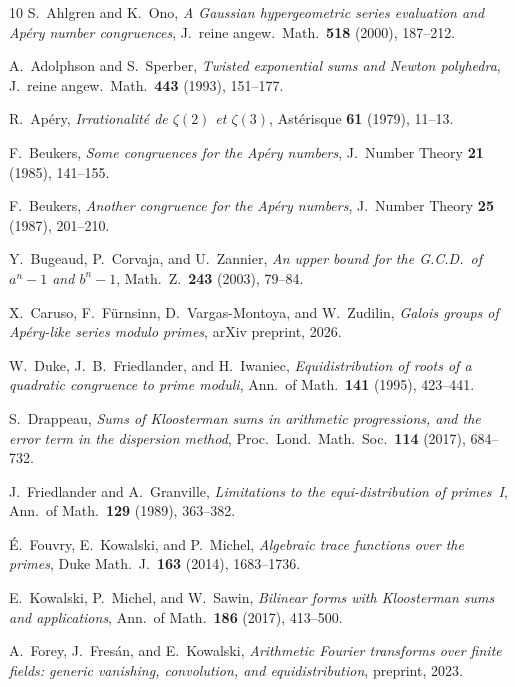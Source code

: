 \documentclass[11pt]{article}
\theoremstyle{definition}
\theoremstyle{remark}
\begin{document}
\begin{thebibliography}{10}
S.~Ahlgren and K.~Ono,
\emph{A Gaussian hypergeometric series evaluation and
Ap\'ery number congruences},
J.~reine angew.\ Math.\ \textbf{518} (2000), 187--212.

A.~Adolphson and S.~Sperber,
\emph{Twisted exponential sums and Newton polyhedra},
J.~reine angew.\ Math.\ \textbf{443} (1993), 151--177.

R.~Ap\'ery,
\emph{Irrationalit\'e de $\zeta(2)$ et $\zeta(3)$},
Ast\'erisque \textbf{61} (1979), 11--13.

F.~Beukers,
\emph{Some congruences for the Ap\'ery numbers},
J.~Number Theory \textbf{21} (1985), 141--155.

F.~Beukers,
\emph{Another congruence for the Ap\'ery numbers},
J.~Number Theory \textbf{25} (1987), 201--210.

Y.~Bugeaud, P.~Corvaja, and U.~Zannier,
\emph{An upper bound for the G.C.D.\ of $a^n - 1$ and $b^n - 1$},
Math.\ Z.\ \textbf{243} (2003), 79--84.

X.~Caruso, F.~F\"urnsinn, D.~Vargas-Montoya, and W.~Zudilin,
\emph{Galois groups of Ap\'ery-like series modulo primes},
arXiv preprint, 2026.

W.~Duke, J.~B.~Friedlander, and H.~Iwaniec,
\emph{Equidistribution of roots of a quadratic congruence
to prime moduli},
Ann.\ of Math.\ \textbf{141} (1995), 423--441.

S.~Drappeau,
\emph{Sums of Kloosterman sums in arithmetic progressions,
and the error term in the dispersion method},
Proc.\ Lond.\ Math.\ Soc.\ \textbf{114} (2017), 684--732.

J.~Friedlander and A.~Granville,
\emph{Limitations to the equi-distribution of primes~I},
Ann.\ of Math.\ \textbf{129} (1989), 363--382.

\'E.~Fouvry, E.~Kowalski, and P.~Michel,
\emph{Algebraic trace functions over the primes},
Duke Math.\ J.\ \textbf{163} (2014), 1683--1736.

E.~Kowalski, P.~Michel, and W.~Sawin,
\emph{Bilinear forms with Kloosterman sums and applications},
Ann.\ of Math.\ \textbf{186} (2017), 413--500.

A.~Forey, J.~Fres\'an, and E.~Kowalski,
\emph{Arithmetic Fourier transforms over finite fields:
generic vanishing, convolution, and equidistribution},
preprint, 2023.


\end{thebibliography}
\end{document}
